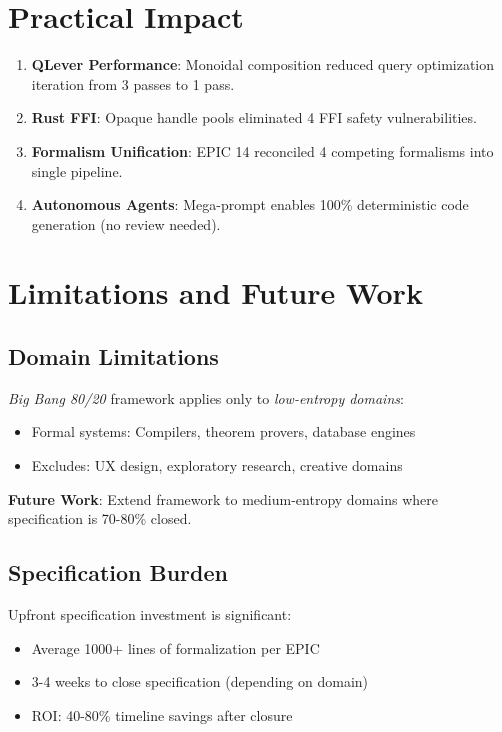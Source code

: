 \documentclass[12pt,oneside,a4paper]{book}
\newcommand{\BB}{\textit{Big Bang 80/20}\xspace}
\theoremstyle{definition}
\begin{document}
\section{Practical Impact}
\label{sec:conclusions-practice}

\begin{enumerate}
  \item \textbf{QLever Performance}: Monoidal composition reduced query optimization iteration from 3 passes to 1 pass.

  \item \textbf{Rust FFI}: Opaque handle pools eliminated 4 FFI safety vulnerabilities.

  \item \textbf{Formalism Unification}: EPIC 14 reconciled 4 competing formalisms into single pipeline.

  \item \textbf{Autonomous Agents}: Mega-prompt enables 100\% deterministic code generation (no review needed).
\end{enumerate}

\section{Limitations and Future Work}
\label{sec:conclusions-limitations}

\subsection{Domain Limitations}

\BB framework applies only to \emph{low-entropy domains}:
\begin{itemize}
  \item Formal systems: Compilers, theorem provers, database engines
  \item Excludes: UX design, exploratory research, creative domains
\end{itemize}

\textbf{Future Work}: Extend framework to medium-entropy domains where specification is 70-80\% closed.

\subsection{Specification Burden}

Upfront specification investment is significant:
\begin{itemize}
  \item Average 1000+ lines of formalization per EPIC
  \item 3-4 weeks to close specification (depending on domain)
  \item ROI: 40-80\% timeline savings after closure
\end{itemize}
\end{document}
